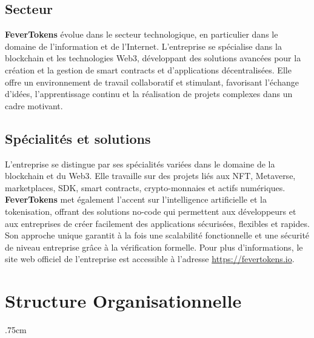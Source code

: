     \subsection{Secteur}
    \textbf{\textcolor{ftRed}{FeverTokens}} évolue dans le secteur technologique, en particulier dans le domaine de l'information et de l'Internet. L'entreprise se spécialise dans la blockchain et les technologies Web3, développant des solutions avancées pour la création et la gestion de smart contracts et d'applications décentralisées. Elle offre un environnement de travail collaboratif et stimulant, favorisant l'échange d'idées, l'apprentissage continu et la réalisation de projets complexes dans un cadre motivant.


    \subsection{Spécialités et solutions}
    L'entreprise se distingue par ses spécialités variées dans le domaine de la blockchain et du Web3. Elle travaille sur des projets liés aux NFT, Metaverse, marketplaces, SDK, smart contracts, crypto-monnaies et actifs numériques. \textbf{\textcolor{ftRed}{FeverTokens}} met également l'accent sur l'intelligence artificielle et la tokenisation, offrant des solutions no-code qui permettent aux développeurs et aux entreprises de créer facilement des applications sécurisées, flexibles et rapides. Son approche unique garantit à la fois une scalabilité fonctionnelle et une sécurité de niveau entreprise grâce à la vérification formelle. Pour plus d'informations, le site web officiel de l'entreprise est accessible à l'adresse \textcolor{ftBlue}{\url{https://fevertokens.io}}.\\[.5cm]


\section{Structure Organisationnelle}
    \leftskip.75cm
